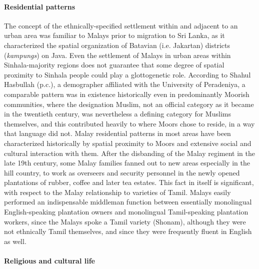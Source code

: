 \paragraph{Residential patterns}%

The concept of the ethnically-specified settlement within and adjacent to an urban area was familiar to Malays prior to migration to Sri Lanka, as it characterized the spatial organization of Batavian (i.e. Jakartan) districts (\textit{kampungs}) on Java. Even the settlement of Malays in urban areas within Sinhala-majority regions does not guarantee that some degree of spatial proximity to Sinhala people could play a glottogenetic role. According to Shahul Hasbullah (p.c.), a demographer affiliated with the University of Peradeniya, a comparable pattern was in existence historically even in predominantly Moorish communities, where the designation Muslim, not an official category as it became in the twentieth century, was nevertheless a defining category for Muslims themselves, and this contributed heavily to where Moors chose to reside, in a way that language did not. Malay residential patterns in most areas have been characterized historically by spatial proximity to Moors and extensive social and cultural interaction with them. After the disbanding of the Malay regiment in the late 19th century, some Malay families fanned out to new areas especially in the hill country, to work as overseers and security personnel in the newly opened plantations of rubber, coffee and later tea estates. This fact in itself is significant, with respect to the Malay relationship to varieties of Tamil. Malays easily performed an indispensable middleman function between essentially monolingual English-speaking plantation owners and monolingual Tamil-speaking plantation workers, since the Malays spoke a Tamil variety (Shonam), although they were not ethnically Tamil themselves, and since they were frequently fluent in English as well.

\paragraph{Religious and cultural life}%

